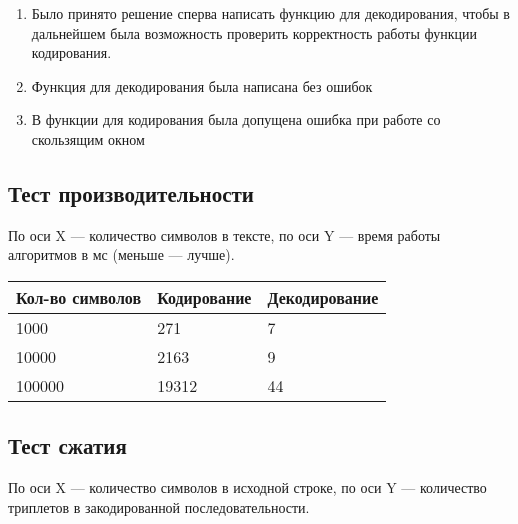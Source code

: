 \documentclass[12pt]{article}
\begin{document}
    \begin{enumerate}
    \item Было принято решение сперва написать функцию для декодирования, чтобы 
        в дальнейшем была возможность проверить корректность работы функции 
        кодирования.
    \item Функция для декодирования была написана без ошибок
    \item В функции для кодирования была допущена ошибка при работе со 
    скользящим окном 
    \end{enumerate}


    \subsection*{Тест производительности}

    По оси X — количество символов в тексте, по оси Y — время работы алгоритмов 
    в мс (меньше — лучше).
    

    \begin{tabular}{ | l | l | l | }
        \hline
            Кол-во символов & Кодирование & Декодирование \\ \hline
            1000            & 271         & 7             \\
            10000           & 2163        & 9             \\
            100000          & 19312       & 44            \\
        \hline
    \end{tabular}

    \subsection*{Тест сжатия}

    По оси X — количество символов в исходной строке, по оси Y — количество 
    триплетов в закодированной последовательности.
\end{document}
